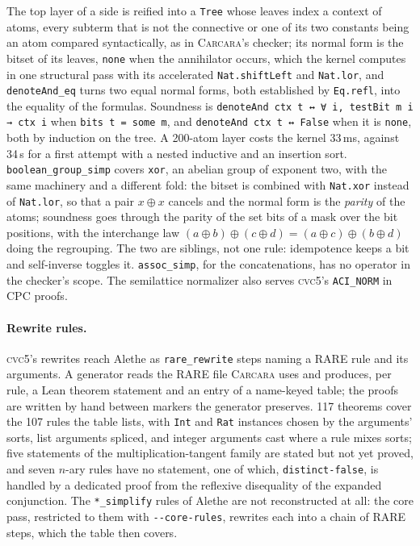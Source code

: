\documentclass[runningheads]{llncs}
\newcommand{\cvcv}{\textsc{cvc5}\xspace}
\newcommand{\carcara}{\textsc{Carcara}\xspace}
\newcommand{\alethe}{Alethe\xspace}
\newcommand{\cpc}{CPC\xspace}
\newcommand{\rare}{RARE\xspace}
\newcommand{\rulename}[1]{\texttt{#1}}
\begin{document}
The top layer of a side is reified into a \lstinline{Tree} whose leaves
index a context of atoms, every subterm that is not the connective or one of
its two constants being an atom compared syntactically, as in \carcara's
checker; its normal form is the bitset of its leaves, \lstinline{none} when
the annihilator occurs, which the kernel computes in one structural pass
with its accelerated \lstinline{Nat.shiftLeft} and \lstinline{Nat.lor}, and
\lstinline{denoteAnd_eq} turns two equal normal forms, both established by
\lstinline{Eq.refl}, into the equality of the formulas. Soundness is
\lstinline{denoteAnd ctx t ↔ ∀ i, testBit m i → ctx i} when
\lstinline{bits t = some m}, and \lstinline{denoteAnd ctx t ↔ False} when it
is \lstinline{none}, both by induction on the tree. A 200-atom layer costs the
kernel 33\,ms, against 34\,s for a first attempt with a nested inductive and
an insertion sort. \rulename{boolean\_group\_simp} covers \texttt{xor}, an
abelian group of exponent two, with the same machinery and a different fold:
the bitset is combined with \lstinline{Nat.xor} instead of \lstinline{Nat.lor},
so that a pair $x \oplus x$ cancels and the normal form is the \emph{parity}
of the atoms; soundness goes through the parity of the set bits of a mask
over the bit positions, with the interchange law
$(a \oplus b) \oplus (c \oplus d) = (a \oplus c) \oplus (b \oplus d)$ doing
the regrouping. The two are siblings, not one rule: idempotence keeps a bit
and self-inverse toggles it. \rulename{assoc\_simp}, for the concatenations,
has no operator in the checker's scope. The semilattice normalizer also
serves \cvcv's \texttt{ACI\_NORM} in \cpc proofs.

\paragraph{Rewrite rules.} \cvcv's rewrites reach \alethe as
\rulename{rare\_rewrite} steps naming a \rare rule and its arguments. A
generator reads the \rare file \carcara uses and produces, per rule, a Lean
theorem statement and an entry of a name-keyed table; the proofs are written
by hand between markers the generator preserves. 117 theorems cover the 107
rules the table lists, with \texttt{Int} and \texttt{Rat} instances chosen
by the arguments' sorts, list arguments spliced, and integer arguments cast
where a rule mixes sorts; five statements of the multiplication-tangent
family are stated but not yet proved, and seven $n$-ary rules have no
statement, one of which, \texttt{distinct-false}, is handled by a dedicated
proof from the reflexive disequality of the expanded conjunction. The
\texttt{*\_simplify} rules of \alethe are not reconstructed at all: the core
pass, restricted to them with \texttt{-{}-core-rules}, rewrites each into a
chain of \rare steps, which the table then covers.
\end{document}
